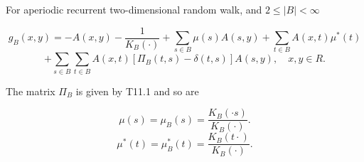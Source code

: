 For aperiodic recurrent two-dimensional random walk, and $2 \leq |B| < \infty$

$$g_B(x,y) = -A(x,y) - \frac{1}{K_B(\cdot)} + \sum_{s \in B} \mu(s)A(s,y) + \sum_{t \in B} A(x,t)\mu^*(t)$$
$$+ \sum_{s \in B} \sum_{t \in B} A(x,t)[\Pi_B(t,s) - \delta(t,s)]A(s,y), \quad x,y \in R.$$

The matrix $\Pi_B$ is given by T11.1 and so are

$$\mu(s) = \mu_B(s) = \frac{K_B(\cdot s)}{K_B(\cdot)}.$$
$$\mu^*(t) = \mu_B^*(t) = \frac{K_B(t \cdot)}{K_B(\cdot)}.$$